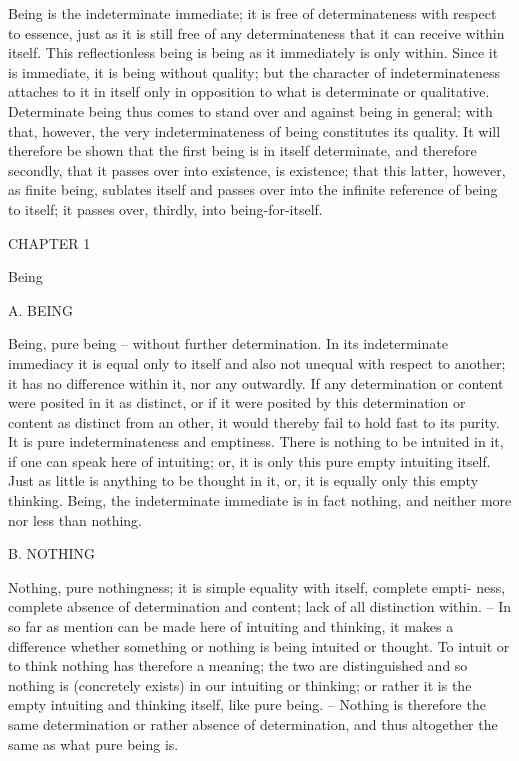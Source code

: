 Being is the indeterminate immediate;
it is free of determinateness with respect to essence,
just as it is still free of any determinateness that it can
receive within itself.
This reflectionless being is being as it immediately is only within.
Since it is immediate, it is being without quality;
but the character of indeterminateness attaches to it in itself
only in opposition to what is determinate or qualitative.
Determinate being thus comes to stand over and against being in general;
with that, however, the very indeterminateness
of being constitutes its quality.
It will therefore be shown that the first being is
in itself determinate, and therefore secondly,
that it passes over into existence, is existence;
that this latter, however, as finite being, sublates itself and
passes over into the infinite reference of being to itself;
it passes over, thirdly, into being-for-itself.

CHAPTER 1

Being

A. BEING

Being, pure being – without further determination.
In its indeterminate immediacy it is equal only to itself and
also not unequal with respect to another;
it has no difference within it, nor any outwardly.
If any determination or content were posited in it as distinct,
or if it were posited by this determination or
content as distinct from an other,
it would thereby fail to hold fast to its purity.
It is pure indeterminateness and emptiness.
There is nothing to be intuited in it,
if one can speak here of intuiting; or, it is
only this pure empty intuiting itself.
 Just as little is anything to be thought
in it, or, it is equally only this empty thinking.
Being, the indeterminate immediate is in fact nothing,
and neither more nor less than nothing.

B. NOTHING

Nothing, pure nothingness; it is simple equality with itself, complete empti-
ness, complete absence of determination and content; lack of all distinction
within. – In so far as mention can be made here of intuiting and thinking,
it makes a difference whether something or nothing is being intuited or
thought. To intuit or to think nothing has therefore a meaning; the two
are distinguished and so nothing is (concretely exists) in our intuiting or
thinking; or rather it is the empty intuiting and thinking itself, like pure
being. – Nothing is therefore the same determination or rather absence of
determination, and thus altogether the same as what pure being is.

